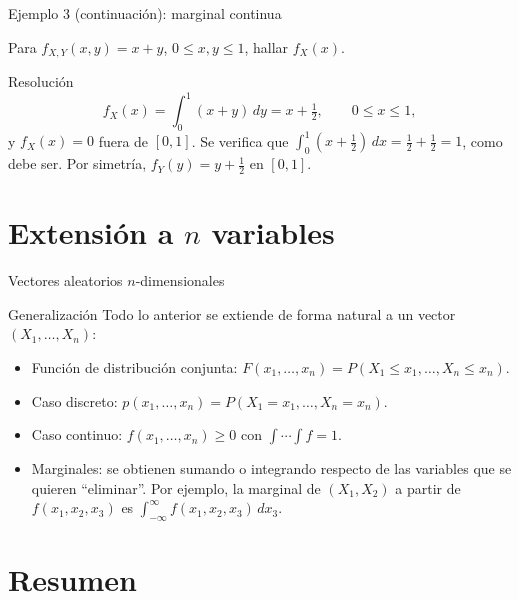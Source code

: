 \documentclass[aspectratio=169,11pt]{beamer}
\begin{document}
\begin{frame}{Ejemplo 3 (continuación): marginal continua}
\begin{example}
Para $f_{X,Y}(x,y) = x+y$, $0\le x,y\le 1$, hallar $f_X(x)$.
\end{example}
\pause
\begin{block}{Resolución}
\[
f_X(x) = \int_0^1 (x+y)\, dy = x + \tfrac12, \qquad 0 \le x \le 1,
\]
y $f_X(x)=0$ fuera de $[0,1]$. Se verifica que $\int_0^1 (x+\tfrac12)\,dx = \tfrac12+\tfrac12=1$, como debe ser. Por simetría, $f_Y(y) = y+\tfrac12$ en $[0,1]$.
\end{block}
\end{frame}

\section{Extensión a $n$ variables}

\begin{frame}{Vectores aleatorios $n$-dimensionales}
\begin{block}{Generalización}
Todo lo anterior se extiende de forma natural a un vector $(X_1,\ldots,X_n)$:
\begin{itemize}
\item Función de distribución conjunta: $F(x_1,\ldots,x_n) = P(X_1\le x_1,\ldots,X_n\le x_n)$.
\item Caso discreto: $p(x_1,\ldots,x_n) = P(X_1=x_1,\ldots,X_n=x_n)$.
\item Caso continuo: $f(x_1,\ldots,x_n) \ge 0$ con $\displaystyle\int\cdots\int f = 1$.
\item Marginales: se obtienen sumando o integrando respecto de las variables que se quieren ``eliminar''. Por ejemplo, la marginal de $(X_1,X_2)$ a partir de $f(x_1,x_2,x_3)$ es $\int_{-\infty}^{\infty} f(x_1,x_2,x_3)\,dx_3$.
\end{itemize}
\end{block}
\end{frame}

\section{Resumen}
\end{document}
